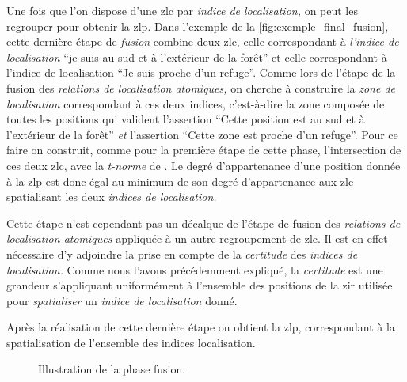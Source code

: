 Une fois que l'on dispose d'une \ac{zlc} par \emph{indice de
  localisation,} on peut les regrouper pour obtenir la \ac{zlp}. Dans
l'exemple de la \autoref{fig:exemple_final_fusion}, cette dernière
étape de \emph{fusion} combine deux \ac{zlc}, celle correspondant à
\emph{l'indice de localisation} \enquote{je suis au sud et à
  l'extérieur de la forêt} et celle correspondant à l'indice de
localisation \enquote{Je suis proche d'un refuge}. Comme lors de
l'étape de la fusion des \emph{relations de localisation atomiques,}
on cherche à construire la \emph{zone de localisation} correspondant à
ces deux indices, c'est-à-dire la zone composée de toutes les
positions qui valident l'assertion \enquote{Cette position est au sud
  et à l'extérieur de la forêt} \emph{et} l'assertion \enquote{Cette
  zone est proche d'un refuge}. Pour ce faire on construit, comme pour
la première étape de cette phase, l'intersection de ces deux \ac{zlc},
avec la \emph{t-norme} de \textcite{Zadeh1965}. Le degré
d’appartenance d'une position donnée à la \ac{zlp} est donc égal au
minimum de son degré d'appartenance aux \ac{zlc} spatialisant les deux
\emph{indices de localisation.}

Cette étape n'est cependant pas un décalque de l'étape de fusion des
\emph{relations de localisation atomiques} appliquée à un autre
regroupement de \ac{zlc}. Il est en effet nécessaire d'y adjoindre la
prise en compte de la \emph{certitude} des \emph{indices de
  localisation.} Comme nous l'avons précédemment expliqué, la
\emph{certitude} est une grandeur s'appliquant uniformément à
l'ensemble des positions de la \ac{zir} utilisée pour
\emph{spatialiser} un \emph{indice de localisation} donné.

Après la réalisation de cette dernière étape on obtient la \ac{zlp},
correspondant à la spatialisation de l'ensemble des indices
localisation.

\begin{landscape}
  \begin{figure}[!h]
    \centering
    
    \caption{Illustration de la phase fusion.}
    \label{fig:exemple_final_fusion}
  \end{figure}
\end{landscape}


